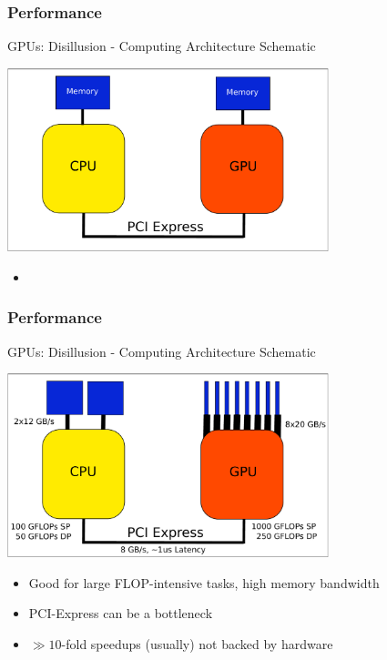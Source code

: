 \begin{frame}[fragile]
\frametitle{Performance}
 \begin{block}{GPUs: Disillusion - Computing Architecture Schematic}
  \begin{center}
   \includegraphics[width=0.7\textwidth]{figs/cpu-gpu-coarse.pdf}
  \end{center}

 
 \begin{itemize}
  \item \vspace*{1.12cm}
 \end{itemize}
 \end{block}

\end{frame}

\begin{frame}[fragile]
\frametitle{Performance}
 \begin{block}{GPUs: Disillusion - Computing Architecture Schematic}
  \begin{center}
   \includegraphics[width=0.7\textwidth]{figs/cpu-gpu-detail.pdf}
  \end{center}

 \begin{itemize}
  \item Good for large FLOP-intensive tasks, high memory bandwidth
  \item PCI-Express can be a bottleneck
  \item $\gg 10$-fold speedups (usually) not backed by hardware
 \end{itemize}
 \end{block}

\end{frame}



